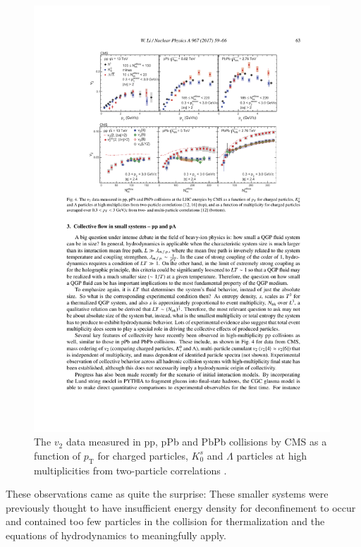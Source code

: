 \begin{figure}[htpb]
  \centering
  \includegraphics[width=0.99\textwidth]{Introduction/small_systems_flow.pdf}
  \caption{The $v_2$ data measured in pp, pPb and PbPb collisions by CMS as a function of $p_\mathrm{T}$ for charged particles, $K_0^s$ and $\Lambda$ particles at high multiplicities from two-particle correlations \cite{Khachatryan2017,Khachatryan2015}.}
  \label{fig:small_systems_v2}
\end{figure}

These observations came as quite the surprise: These smaller systems were previously thought to have insufficient energy density for deconfinement to occur and contained too few particles in the collision for thermalization and the equations of hydrodynamics to meaningfully apply.


